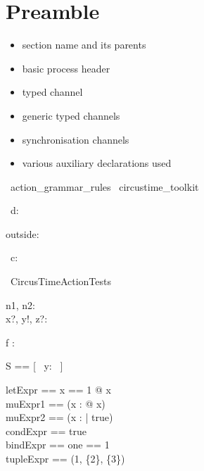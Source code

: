\documentclass{article}
\begin{document}
\section{Preamble}

\begin{itemize}
   \item section name and its parents
   \item basic process header
   \item typed channel
   \item generic typed channels
   \item synchronisation channels
   \item various auxiliary declarations used
\end{itemize}

\begin{zsection}
  \SECTION\ action\_grammar\_rules \parents\ circustime\_toolkit
\end{zsection}

\begin{circus}
     \circchannel\ d: \nat \\
\end{circus}

\begin{axdef}
    outside: \nat
\end{axdef}

\begin{circus}
   \circchannel\ c: \nat \cross \nat \cross \nat \cross \nat
\end{circus}

\begin{circus}
   \circprocess\ CircusTimeActionTests \circdef \circbegin
\end{circus}

\begin{axdef}
   n1, n2: \nat \\
   x?, y!, z?: \nat
\end{axdef}

\begin{axdef}
   f : \nat \fun \nat \cross \nat
\end{axdef}

\begin{zed}
   S == [~ y: \nat ~]
\end{zed}

\begin{zed}
  letExpr == \LET x == 1 @ x\\
  muExpr1 == (\mu x : \nat @ x)\\
  muExpr2 == (\mu x : \nat | true)\\
  condExpr == \IF true  \\
  bindExpr == \lblot one == 1 \rblot\\
  tupleExpr == (1, \{2\}, \power \{3\})\\
\end{zed}
\end{document}
